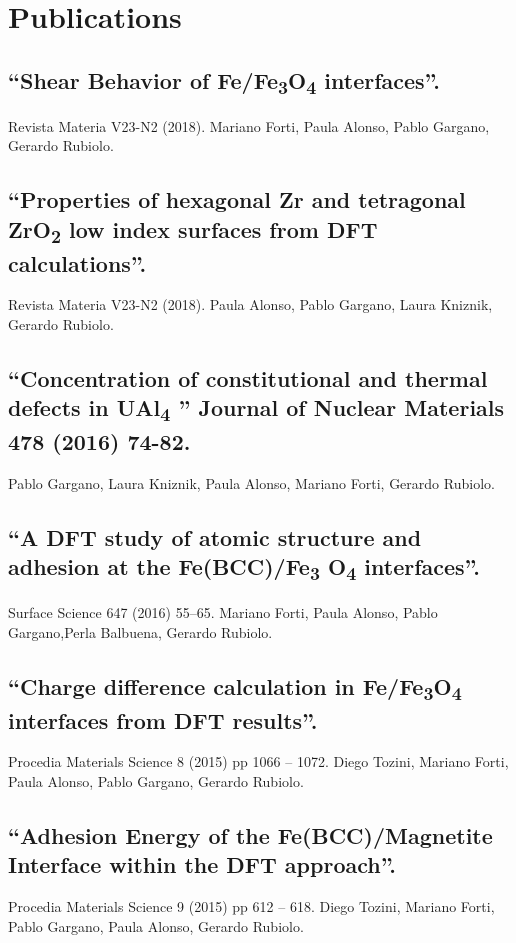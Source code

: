 \section{Publications}

\subsection{“Shear Behavior of Fe/Fe\textsubscript{3}O\textsubscript{4} interfaces”. } Revista Materia V23-N2 (2018). Mariano Forti, Paula Alonso, Pablo Gargano, Gerardo Rubiolo. 

\subsection{“Properties of hexagonal Zr and tetragonal ZrO\textsubscript{2} low index surfaces from DFT calculations”. } Revista Materia V23-N2 (2018). Paula Alonso, Pablo Gargano, Laura Kniznik, Gerardo Rubiolo. 

\subsection{“Concentration of constitutional and thermal defects in UAl\textsubscript{4} ” Journal of Nuclear Materials 478 (2016) 74-82. } Pablo Gargano, Laura Kniznik, Paula Alonso, Mariano Forti, Gerardo Rubiolo.

\subsection{“A DFT study of atomic structure and adhesion at the Fe(BCC)/Fe\textsubscript{3} O\textsubscript{4} interfaces”. } Surface Science 647 (2016) 55–65. Mariano Forti, Paula Alonso, Pablo Gargano,Perla Balbuena, Gerardo Rubiolo.

\subsection{“Charge difference calculation in Fe/Fe\textsubscript{3}O\textsubscript{4} interfaces from DFT results”. } Procedia Materials Science 8 (2015) pp 1066 – 1072. Diego Tozini, Mariano Forti, Paula Alonso, Pablo Gargano, Gerardo Rubiolo.

\subsection{“Adhesion Energy of the Fe(BCC)/Magnetite Interface within the DFT approach”. } Procedia Materials Science 9 (2015) pp 612 – 618. Diego Tozini, Mariano Forti, Pablo Gargano, Paula Alonso, Gerardo Rubiolo. 

